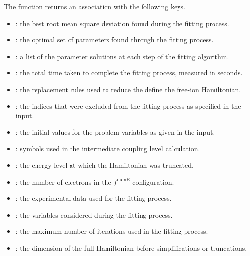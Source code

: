\documentclass[11pt, twoside,openright]{article}
\begin{document}
The function returns an association with the following keys.

\begin{itemize}
    \item {}: the best root mean square deviation found during the fitting process.

    \item {}: the optimal set of parameters found through the fitting process.

    \item {}: a list of the parameter solutions at each step of the fitting algorithm.

    \item {}: the total time taken to complete the fitting process, measured in seconds.

    \item {}: the replacement rules used to reduce the define the free-ion Hamiltonian.

    \item {}: the indices that were excluded from the fitting process as specified in the input.

    \item {}: the initial values for the problem variables as given in the input.

    \item {}: symbols used in the intermediate coupling level calculation.

    \item {}: the energy level at which the Hamiltonian was truncated.

    \item {}: the number of electrons in the $f^{\text{numE}}$ configuration.

    \item {}: the experimental data used for the fitting process. 

    \item {}: the variables considered during the fitting process.

    \item {}: the maximum number of iterations used in the fitting process.

    \item {}: the dimension of the full Hamiltonian before simplifications or truncations.


\end{itemize}
\end{document}
